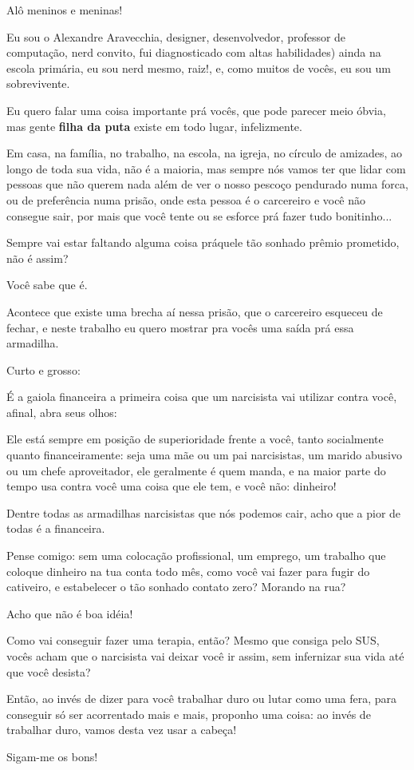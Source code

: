 \begin{multicols}{2}
{\small	Alô meninos e meninas!

Eu sou o Alexandre Aravecchia, designer, desenvolvedor, professor de computação, nerd convito, fui diagnosticado com altas habilidades) ainda na escola primária, eu sou nerd mesmo, raiz!, e, como muitos de vocês, eu sou um sobrevivente.

Eu quero falar uma coisa importante prá vocês, que pode parecer meio óbvia, mas gente \textbf{filha da puta} existe em todo lugar, infelizmente.

Em casa, na família, no trabalho, na escola, na igreja, no círculo de amizades, ao longo de toda sua vida, não é a maioria, mas sempre nós vamos ter que lidar com pessoas que não querem nada além de ver o nosso pescoço pendurado numa forca, ou de preferência numa prisão, onde esta pessoa é o carcereiro e você não consegue sair, por mais que você tente ou se esforce prá fazer tudo bonitinho...

Sempre vai estar faltando alguma coisa práquele tão sonhado prêmio prometido, não é assim?

Você sabe que é.

Acontece que existe uma brecha aí nessa prisão, que o carcereiro esqueceu de fechar, e neste trabalho eu quero mostrar pra vocês uma saída prá essa armadilha.

Curto e grosso:

É a gaiola financeira a primeira coisa que um narcisista vai utilizar contra você, afinal, abra seus olhos:

Ele está sempre em posição de superioridade frente a você, tanto socialmente quanto financeiramente: seja uma mãe ou um pai narcisistas, um marido abusivo ou um chefe aproveitador, ele geralmente é quem manda, e na maior parte do tempo usa contra você uma coisa que ele tem, e você não: dinheiro!

Dentre todas as armadilhas narcisistas que nós podemos cair, acho que a pior de todas é a financeira.

Pense comigo: sem uma colocação profissional, um emprego, um trabalho que coloque dinheiro na tua conta todo mês, como você vai fazer para fugir do cativeiro, e estabelecer o tão sonhado contato zero? Morando na rua?

Acho que não é boa idéia!

Como vai conseguir fazer uma terapia, então? Mesmo que consiga pelo SUS, vocês acham que o narcisista vai deixar você ir assim, sem infernizar sua vida até que você desista?

Então, ao invés de dizer para você trabalhar duro ou lutar como uma fera, para conseguir só ser acorrentado mais e mais, proponho uma coisa: ao invés de trabalhar duro, vamos desta vez usar a cabeça!

Sigam-me os bons!
}
\vfill\null
\pagebreak

\end{multicols}